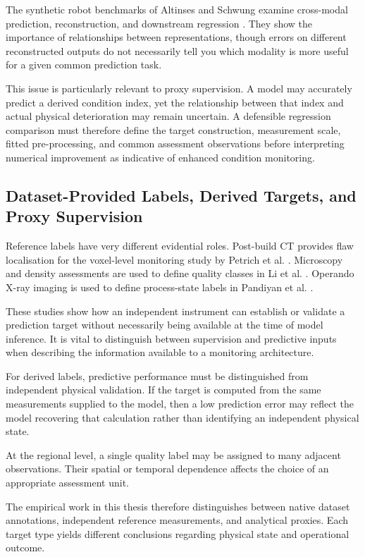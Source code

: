 The synthetic robot benchmarks of Altinses and Schwung examine cross-modal prediction,
reconstruction, and downstream regression \citep{Altinses2025Performance}. They show the importance
of relationships between representations, though errors on different reconstructed outputs do not
necessarily tell you which modality is more useful for a given common prediction task.

This issue is particularly relevant to proxy supervision. A model may accurately predict a derived
condition index, yet the relationship between that index and actual physical deterioration may
remain uncertain. A defensible regression comparison must therefore define the target construction,
measurement scale, fitted pre-processing, and common assessment observations before interpreting
numerical improvement as indicative of enhanced condition monitoring.

\subsection{Dataset-Provided Labels, Derived Targets, and Proxy Supervision}

Reference labels have very different evidential roles. Post-build CT provides flaw localisation for
the voxel-level monitoring study by Petrich et al. \citep{Petrich2021Multimodal}. Microscopy and
density assessments are used to define quality classes in Li et al. \citep{Li2022A}. Operando X-ray
imaging is used to define process-state labels in Pandiyan et al. \citep{Pandiyan2022Deep}.

These studies show how an independent instrument can establish or validate a prediction target
without necessarily being available at the time of model inference. It is vital to distinguish
between supervision and predictive inputs when describing the information available to a monitoring
architecture.

For derived labels, predictive performance must be distinguished from independent physical
validation. If the target is computed from the same measurements supplied to the model, then a low
prediction error may reflect the model recovering that calculation rather than identifying an
independent physical state.

At the regional level, a single quality label may be assigned to many adjacent observations. Their
spatial or temporal dependence affects the choice of an appropriate assessment unit.

The empirical work in this thesis therefore distinguishes between native dataset annotations,
independent reference measurements, and analytical proxies. Each target type yields different
conclusions regarding physical state and operational outcome.

